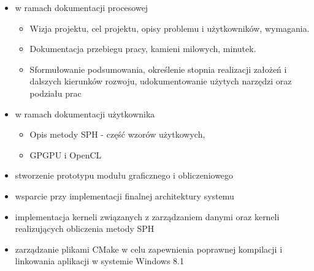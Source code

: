 \documentclass[polish, 12pt]{aghthesis}
\begin{document}
		\begin{itemize}
			
			\item w ramach dokumentacji procesowej
			
				\begin{itemize}
				
					\item Wizja projektu, cel projektu, opisy problemu i użytkowników, wymagania.
					
					\item Dokumentacja przebiegu pracy, kamieni milowych, minutek.
					
					\item Sformułowanie podsumowania, określenie stopnia realizacji założeń i dalszych kierunków rozwoju, udokumentowanie użytych narzędzi oraz podziału prac
				
				\end{itemize}
			
			\item w ramach dokumentacji użytkownika
			
				\begin{itemize}
				
					\item Opis metody SPH - część wzorów użytkowych, 
					
					\item GPGPU i OpenCL
				
				\end{itemize}
			
			\item stworzenie prototypu modułu graficznego i obliczeniowego
			
			\item wsparcie przy implementacji finalnej architektury systemu
			
			\item implementacja kerneli związanych z zarządzaniem danymi oraz kerneli realizujących obliczenia metody SPH
					
			\item zarządzanie plikami CMake w celu zapewnienia poprawnej kompilacji i linkowania aplikacji w systemie Windows 8.1
		
		\end{itemize}
		
\end{document}

